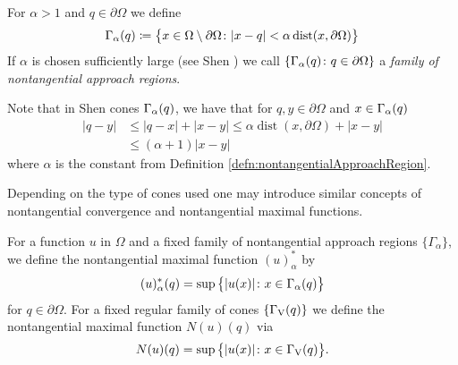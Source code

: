 \begin{defn}
  \label{defn:nontangentialApproachRegion}
   For $\alpha > 1$ and $q \in \partial\Omega$ we define 
   \begin{align*}
     \Gamma_\alpha(q) \coloneqq \big\{ x \in \Omega \setminus \partial\Omega \colon |x - q| < \alpha \operatorname{dist}(x, \partial\Omega) \big\}
   \end{align*}
   If $\alpha$ is chosen sufficiently large (see Shen \cite{shen2017}) we call $\{ \Gamma_\alpha(q) \colon q \in \partial\Omega\}$ a \emph{family of nontangential approach regions}.
\end{defn}

  Note that in Shen cones $\Gamma_\alpha(q)$, we have that for $q, y \in \partial\Omega$ and $x \in \Gamma_\alpha(q)$
\begin{align}
  \label{eq:shenConeEstimate}
  |q - y| 
  &\leq |q - x| + |x - y| 
  \leq \alpha \operatorname{dist}(x, \partial\Omega) + |x - y|  \nonumber\\
  &\leq (\alpha + 1) |x - y|
\end{align}
where $\alpha$ is the constant from Definition \ref{defn:nontangentialApproachRegion}. 

Depending on the type of cones used one may introduce similar concepts of nontangential convergence and nontangential maximal functions.

\begin{defn}
  For a function $u$ in $\Omega$ and a fixed family of nontangential approach regions $\{\Gamma_\alpha\}$, we define the nontangential maximal function $(u)_\alpha^*$ by
\begin{align}
  \label{eq:defnNontangMaxFunction}
  (u)_\alpha^*(q) = \sup\big\{ |u(x)| \colon x \in \Gamma_\alpha(q)\big\}
\end{align}
for $q \in \partial\Omega$.
  For a fixed regular family of cones $\{\Gamma_\mathrm{V}(q)\}$ we define the nontangential maximal function $N(u)(q)$ via
  \begin{align*}
    N(u)(q) = \sup\big\{ |u(x)| \colon x \in \Gamma_\mathrm{V}(q)\big\}.
  \end{align*}
\end{defn}

